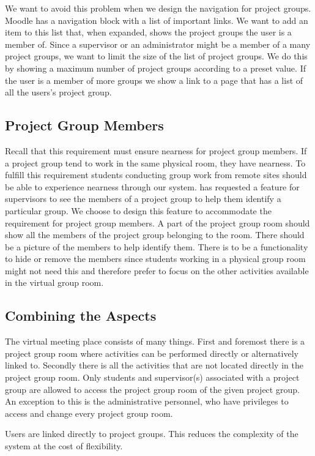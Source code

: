 We want to avoid this problem when we design the navigation for project groups.
Moodle has a navigation block with a list of important links.
We want to add an item to this list that, when expanded, shows the project groups the user is a member of.
Since a supervisor or an administrator might be a member of a many project groups, we want to limit the size of the list of project groups.
We do this by showing a maximum number of project groups according to a preset value.
If the user is a member of more groups we show a link to a page that has a list of all the users's project group.


\subsection{Project Group Members}
\label{sub:projGrpMembers}
Recall that this requirement must ensure nearness for project group members.
If a project group tend to work in the same physical room, they have nearness.
To fulfill this requirement students conducting group work from remote sites should be able to experience nearness through our system.
\supervisorgroup{} has requested a feature for supervisors to see the members of a project group to help them identify a particular group.
We choose to design this feature to accommodate the requirement for project group members.
A part of the project group room should show all the members of the project group belonging to the room.
There should be a picture of the members to help identify them.
There is to be a functionality to hide or remove the members since students working in a physical group room might not need this and therefore prefer to focus on the other activities available in the virtual group room.

\subsection{Combining the Aspects}
The virtual meeting place consists of many things.
First and foremost there is a project group room where activities can be performed directly or alternatively linked to.
Secondly there is all the activities that are not located directly in the project group room.
Only students and supervisor(s) associated with a project group are allowed to access the project group room of the given project group.
An exception to this is the administrative personnel, who have privileges to access and change every project group room.

Users are linked directly to project groups.
This reduces the complexity of the system at the cost of flexibility.


